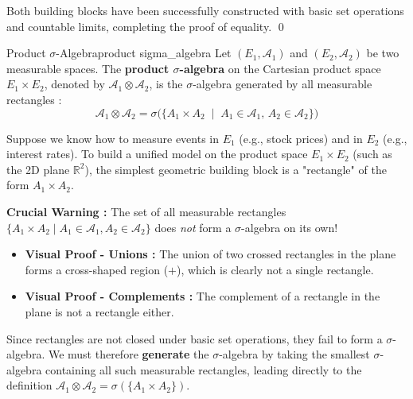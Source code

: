 Both building blocks have been successfully constructed with basic set operations and countable limits, completing the proof of equality. \qed


\begin{definition}{Product $\sigma$-Algebra}{product sigma_algebra}
Let $(E_1, \mathcal{A}_1)$ and $(E_2, \mathcal{A}_2)$ be two measurable spaces. The \textbf{product $\sigma$-algebra} on the Cartesian product space $E_1 \times E_2$, denoted by $\mathcal{A}_1 \otimes \mathcal{A}_2$, is the $\sigma$-algebra generated by all measurable rectangles :
\[
    \mathcal{A}_1 \otimes \mathcal{A}_2 = \sigma\Big( \big\{ A_1 \times A_2 \;\mid\; A_1 \in \mathcal{A}_1,\, A_2 \in \mathcal{A}_2 \big\} \Big)
\]
\end{definition}

\begin{insight}
Suppose we know how to measure events in $E_1$ (e.g., stock prices) and in $E_2$ (e.g., interest rates). To build a unified model on the product space $E_1 \times E_2$ (such as the 2D plane $\mathbb{R}^2$), the simplest geometric building block is a "rectangle" of the form $A_1 \times A_2$.

\textbf{Crucial Warning :} The set of all measurable rectangles $\{A_1 \times A_2 \mid A_1 \in \mathcal{A}_1, A_2 \in \mathcal{A}_2\}$ does \emph{not} form a $\sigma$-algebra on its own!

\begin{itemize}
    \item \textbf{Visual Proof - Unions :} The union of two crossed rectangles in the plane forms a cross-shaped region ($\mathbf{+}$), which is clearly not a single rectangle.
    \item \textbf{Visual Proof - Complements :} The complement of a rectangle in the plane is not a rectangle either.
\end{itemize}

Since rectangles are not closed under basic set operations, they fail to form a $\sigma$-algebra. We must therefore \textbf{generate} the $\sigma$-algebra by taking the smallest $\sigma$-algebra containing all such measurable rectangles, leading directly to the definition $\mathcal{A}_1 \otimes \mathcal{A}_2 = \sigma(\{A_1 \times A_2\})$.
\end{insight}
\vspace{1em}

